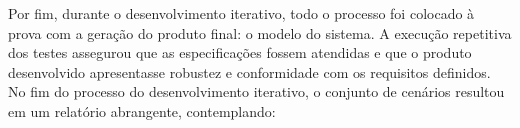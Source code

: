 Por fim, durante o desenvolvimento iterativo, todo o processo foi colocado à prova com a geração do produto final: o modelo do sistema. A execução repetitiva dos 
testes assegurou que as especificações fossem atendidas e que o produto desenvolvido apresentasse robustez e conformidade com os requisitos definidos. No fim do 
processo do desenvolvimento iterativo, o conjunto de cenários resultou em um relatório abrangente, contemplando:





